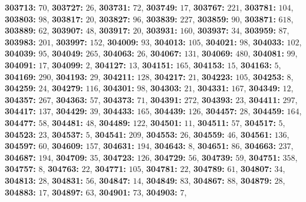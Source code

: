 \textsf{\bfseries 303713:} $70$, \textsf{\bfseries 303727:} $26$, \textsf{\bfseries 303731:} $72$, \textsf{\bfseries 303749:} $17$, \textsf{\bfseries 303767:} $221$, \textsf{\bfseries 303781:} $104$, \textsf{\bfseries 303803:} $98$, \textsf{\bfseries 303817:} $20$, \textsf{\bfseries 303827:} $96$, \textsf{\bfseries 303839:} $227$, \textsf{\bfseries 303859:} $90$, \textsf{\bfseries 303871:} $618$, \textsf{\bfseries 303889:} $62$, \textsf{\bfseries 303907:} $48$, \textsf{\bfseries 303917:} $20$, \textsf{\bfseries 303931:} $160$, \textsf{\bfseries 303937:} $34$, \textsf{\bfseries 303959:} $87$, \textsf{\bfseries 303983:} $201$, \textsf{\bfseries 303997:} $152$, \textsf{\bfseries 304009:} $93$, \textsf{\bfseries 304013:} $105$, \textsf{\bfseries 304021:} $98$, \textsf{\bfseries 304033:} $102$, \textsf{\bfseries 304039:} $95$, \textsf{\bfseries 304049:} $265$, \textsf{\bfseries 304063:} $26$, \textsf{\bfseries 304067:} $131$, \textsf{\bfseries 304069:} $480$, \textsf{\bfseries 304081:} $99$, \textsf{\bfseries 304091:} $17$, \textsf{\bfseries 304099:} $2$, \textsf{\bfseries 304127:} $13$, \textsf{\bfseries 304151:} $165$, \textsf{\bfseries 304153:} $15$, \textsf{\bfseries 304163:} $5$, \textsf{\bfseries 304169:} $290$, \textsf{\bfseries 304193:} $29$, \textsf{\bfseries 304211:} $128$, \textsf{\bfseries 304217:} $21$, \textsf{\bfseries 304223:} $105$, \textsf{\bfseries 304253:} $8$, \textsf{\bfseries 304259:} $24$, \textsf{\bfseries 304279:} $116$, \textsf{\bfseries 304301:} $98$, \textsf{\bfseries 304303:} $21$, \textsf{\bfseries 304331:} $167$, \textsf{\bfseries 304349:} $12$, \textsf{\bfseries 304357:} $267$, \textsf{\bfseries 304363:} $57$, \textsf{\bfseries 304373:} $71$, \textsf{\bfseries 304391:} $272$, \textsf{\bfseries 304393:} $23$, \textsf{\bfseries 304411:} $297$, \textsf{\bfseries 304417:} $137$, \textsf{\bfseries 304429:} $39$, \textsf{\bfseries 304433:} $165$, \textsf{\bfseries 304439:} $126$, \textsf{\bfseries 304457:} $28$, \textsf{\bfseries 304459:} $164$, \textsf{\bfseries 304477:} $58$, \textsf{\bfseries 304481:} $48$, \textsf{\bfseries 304489:} $122$, \textsf{\bfseries 304501:} $11$, \textsf{\bfseries 304511:} $57$, \textsf{\bfseries 304517:} $5$, \textsf{\bfseries 304523:} $23$, \textsf{\bfseries 304537:} $5$, \textsf{\bfseries 304541:} $209$, \textsf{\bfseries 304553:} $26$, \textsf{\bfseries 304559:} $46$, \textsf{\bfseries 304561:} $136$, \textsf{\bfseries 304597:} $60$, \textsf{\bfseries 304609:} $157$, \textsf{\bfseries 304631:} $194$, \textsf{\bfseries 304643:} $8$, \textsf{\bfseries 304651:} $86$, \textsf{\bfseries 304663:} $237$, \textsf{\bfseries 304687:} $194$, \textsf{\bfseries 304709:} $35$, \textsf{\bfseries 304723:} $126$, \textsf{\bfseries 304729:} $56$, \textsf{\bfseries 304739:} $59$, \textsf{\bfseries 304751:} $358$, \textsf{\bfseries 304757:} $8$, \textsf{\bfseries 304763:} $22$, \textsf{\bfseries 304771:} $105$, \textsf{\bfseries 304781:} $22$, \textsf{\bfseries 304789:} $61$, \textsf{\bfseries 304807:} $34$, \textsf{\bfseries 304813:} $28$, \textsf{\bfseries 304831:} $56$, \textsf{\bfseries 304847:} $14$, \textsf{\bfseries 304849:} $83$, \textsf{\bfseries 304867:} $88$, \textsf{\bfseries 304879:} $28$, \textsf{\bfseries 304883:} $17$, \textsf{\bfseries 304897:} $63$, \textsf{\bfseries 304901:} $73$, \textsf{\bfseries 304903:} $7$, 
